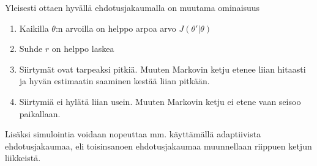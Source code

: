 Yleisesti ottaen hyvällä ehdotusjakaumalla on muutama ominaisuus\cite[s.~280]{gelman_andrew_bayesian_nodate}
\begin{enumerate}
	\item Kaikilla $\theta$:n arvoilla on helppo arpoa arvo $J(\theta'|\theta)$
	\item Suhde $r$ on helppo laskea
	\item Siirtymät ovat tarpeaksi pitkiä. Muuten Markovin ketju etenee liian hitaasti ja hyvän estimaatin saaminen kestää liian pitkään.
	\item Siirtymiä ei hylätä liian usein. Muuten Markovin ketju ei etene vaan seisoo paikallaan.
\end{enumerate}

Lisäksi simulointia voidaan nopeuttaa mm. käyttämällä adaptiivista ehdotusjakaumaa, eli toisinsanoen ehdotusjakaumaa muunnellaan riippuen ketjun liikkeistä. \cite[s.~295]{gelman_andrew_bayesian_nodate}
















